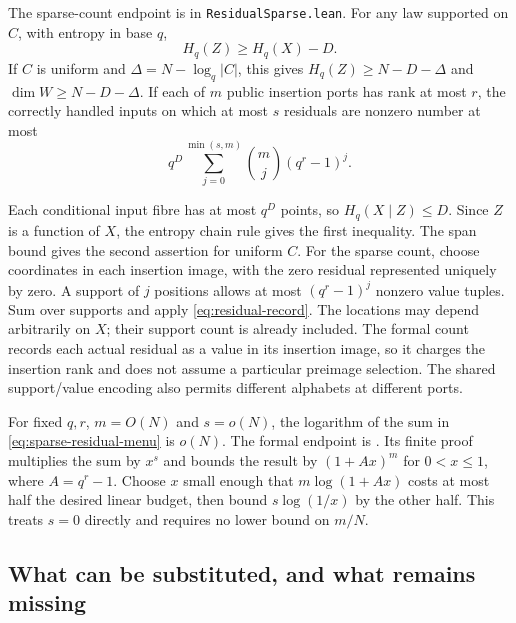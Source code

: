 \begin{corollary}\label{cor:residual-information}
The sparse-count endpoint is  in
\texttt{ResidualSparse.lean}.
For any law supported on $C$, with entropy in base $q$,
\[
 H_q(Z)\ge H_q(X)-D.
\]
If $C$ is uniform and $\Delta=N-\log_q|C|$, this gives
$H_q(Z)\ge N-D-\Delta$ and $\dim W\ge N-D-\Delta$.
If each of $m$ public insertion ports has rank at most $r$, the correctly
handled inputs on which at most $s$ residuals are nonzero number at most
\begin{equation}\label{eq:sparse-residual-menu}
 q^D\sum_{j=0}^{\min(s,m)}\binom mj(q^r-1)^j.
\end{equation}
\end{corollary}

\begin{outline}
Each conditional input fibre has at most $q^D$ points, so
$H_q(X\mid Z)\le D$. Since $Z$ is a function of $X$, the entropy chain rule
gives the first inequality. The span bound gives the second assertion for
uniform $C$. For the sparse count, choose coordinates in each insertion
image, with the zero residual represented uniquely by zero. A support of
$j$ positions allows at most $(q^r-1)^j$ nonzero value tuples. Sum over
supports and apply \cref{eq:residual-record}. The locations may depend
arbitrarily on $X$; their support count is already included. The formal
count records each actual residual as a value in its insertion image,
so it charges the insertion rank and does not assume a particular
preimage selection. The shared support/value encoding also permits
different alphabets at different ports.
\end{outline}

For fixed $q,r$, $m=O(N)$ and $s=o(N)$, the logarithm of the sum in
\cref{eq:sparse-residual-menu} is $o(N)$. The formal endpoint is
. Its finite proof multiplies
the sum by $x^s$ and bounds the result by $(1+Ax)^m$ for $0<x\le1$,
where $A=q^r-1$.
Choose $x$ small enough that $m\log(1+Ax)$ costs at most half the desired
linear budget, then bound $s\log(1/x)$ by the other half. This treats
$s=0$ directly and requires no lower bound on $m/N$.

\subsection{What can be substituted, and what remains missing}

